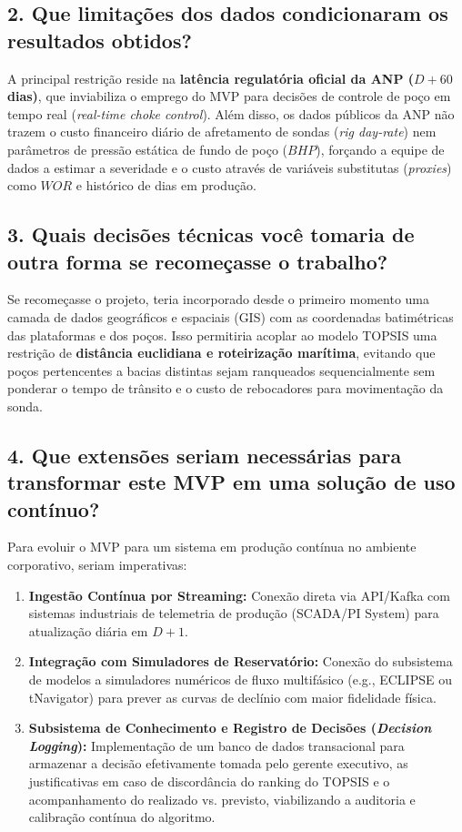 \documentclass[12pt,a4paper]{article}
\begin{document}
\subsection{2. Que limitações dos dados condicionaram os resultados obtidos?}
A principal restrição reside na \textbf{latência regulatória oficial da ANP ($D+60$ dias)}, que inviabiliza o emprego do MVP para decisões de controle de poço em tempo real (\textit{real-time choke control}). Além disso, os dados públicos da ANP não trazem o custo financeiro diário de afretamento de sondas (\textit{rig day-rate}) nem parâmetros de pressão estática de fundo de poço ($BHP$), forçando a equipe de dados a estimar a severidade e o custo através de variáveis substitutas (\textit{proxies}) como $WOR$ e histórico de dias em produção.

\subsection{3. Quais decisões técnicas você tomaria de outra forma se recomeçasse o trabalho?}
Se recomeçasse o projeto, teria incorporado desde o primeiro momento uma camada de dados geográficos e espaciais (GIS) com as coordenadas batimétricas das plataformas e dos poços. Isso permitiria acoplar ao modelo TOPSIS uma restrição de \textbf{distância euclidiana e roteirização marítima}, evitando que poços pertencentes a bacias distintas sejam ranqueados sequencialmente sem ponderar o tempo de trânsito e o custo de rebocadores para movimentação da sonda.

\subsection{4. Que extensões seriam necessárias para transformar este MVP em uma solução de uso contínuo?}
Para evoluir o MVP para um sistema em produção contínua no ambiente corporativo, seriam imperativas:
\begin{enumerate}
    \item \textbf{Ingestão Contínua por Streaming:} Conexão direta via API/Kafka com sistemas industriais de telemetria de produção (SCADA/PI System) para atualização diária em $D+1$.
    \item \textbf{Integração com Simuladores de Reservatório:} Conexão do subsistema de modelos a simuladores numéricos de fluxo multifásico (e.g., ECLIPSE ou tNavigator) para prever as curvas de declínio com maior fidelidade física.
    \item \textbf{Subsistema de Conhecimento e Registro de Decisões (\textit{Decision Logging}):} Implementação de um banco de dados transacional para armazenar a decisão efetivamente tomada pelo gerente executivo, as justificativas em caso de discordância do ranking do TOPSIS e o acompanhamento do realizado vs. previsto, viabilizando a auditoria e calibração contínua do algoritmo.
\end{enumerate}
\end{document}
